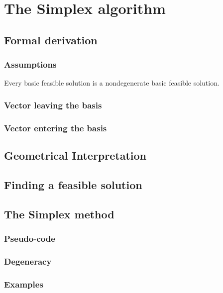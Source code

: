 \chapter{The Simplex algorithm}

\section{Formal derivation}

\subsection{Assumptions}
\begin{assumption}
    Every basic feasible solution is a nondegenerate basic
feasible solution.
\end{assumption}

\subsection{Vector leaving the basis}

\subsection{Vector entering the basis}

\section{Geometrical Interpretation}

\section{Finding a feasible solution}

\section{The Simplex method}

\subsection{Pseudo-code}
\subsection{Degeneracy}
\subsection{Examples}
